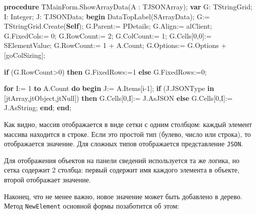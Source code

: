 \documentclass[
]{article}
\newenvironment{Shaded}{}{}
\newcommand{\DataTypeTok}[1]{\textcolor[rgb]{0.56,0.13,0.00}{#1}}
\newcommand{\DecValTok}[1]{\textcolor[rgb]{0.25,0.63,0.44}{#1}}
\newcommand{\KeywordTok}[1]{\textcolor[rgb]{0.00,0.44,0.13}{\textbf{#1}}}
\newcommand{\NormalTok}[1]{#1}
\begin{document}
\begin{Shaded}
\begin{Highlighting}[]
\KeywordTok{procedure}\NormalTok{ TMainForm.ShowArrayData(A : TJSONArray);}
\KeywordTok{var}
\NormalTok{  G: TStringGrid;}
\NormalTok{  I: }\DataTypeTok{Integer}\NormalTok{;}
\NormalTok{  J: TJSONData;}
\KeywordTok{begin}
\NormalTok{  DataTopLabel(SArrayData);}
\NormalTok{  G:= TStringGrid.Create(}\KeywordTok{Self}\NormalTok{);}
\NormalTok{  G.Parent:= PDetails;}
\NormalTok{  G.Align:= alClient;}
\NormalTok{  G.FixedCols:= }\DecValTok{0}\NormalTok{;}
\NormalTok{  G.RowCount:= }\DecValTok{2}\NormalTok{;}
\NormalTok{  G.ColCount:= }\DecValTok{1}\NormalTok{;}
\NormalTok{  G.Cells[}\DecValTok{0}\NormalTok{,}\DecValTok{0}\NormalTok{]:= SElementValue;}
\NormalTok{  G.RowCount:= }\DecValTok{1}\NormalTok{ + A.Count;}
\NormalTok{  G.Options:= G.Options + [goColSizing];}

  \KeywordTok{if}\NormalTok{ (G.RowCount\textgreater{}}\DecValTok{0}\NormalTok{) }\KeywordTok{then}
\NormalTok{    G.FixedRows:=}\DecValTok{1}
  \KeywordTok{else}
\NormalTok{    G.FixedRows:=}\DecValTok{0}\NormalTok{;}

  \KeywordTok{for}\NormalTok{ I:= }\DecValTok{1} \KeywordTok{to}\NormalTok{ A.Count }\KeywordTok{do}
  \KeywordTok{begin}
\NormalTok{    J:= A.Items[i}\DecValTok{{-}1}\NormalTok{];}
    \KeywordTok{if}\NormalTok{ (J.JSONType }\KeywordTok{in}\NormalTok{ [jtArray,jtObject,jtNull]) }\KeywordTok{then}
\NormalTok{      G.Cells[}\DecValTok{0}\NormalTok{,I]:= J.AsJSON}
    \KeywordTok{else}
\NormalTok{      G.Cells[}\DecValTok{0}\NormalTok{,I]:= J.AsString;}
  \KeywordTok{end}\NormalTok{;}
\KeywordTok{end}\NormalTok{;}
\end{Highlighting}
\end{Shaded}

Как видно, массив отображается в виде сетки с одним столбцом: каждый
элемент массива находится в строке. Если это простой тип (булево, число
или строка), то отображается значение. Для сложных типов отображается
представление \texttt{JSON}.

Для отображения объектов на панели сведений используется та же логика,
но сетка содержит 2 столбца: первый содержит имя каждого элемента в
объекте, второй отображает значение.

Наконец, что не менее важно, новое значение может быть добавлено в
дерево. Метод \texttt{NewElement} основной формы позаботится об этом:
\end{document}
